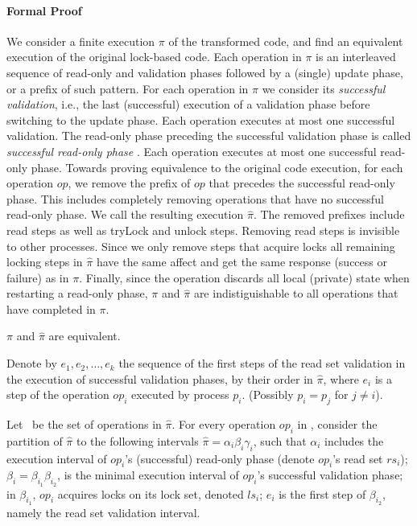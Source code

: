 \paragraph{Formal Proof}
We consider a finite execution $\pi$ of the transformed
code, and find an equivalent execution of the original lock-based
code.
Each operation in $\pi$ is an interleaved sequence of read-only and validation phases followed by a (single) update phase, or a prefix of such pattern.
For each operation in $\pi$ we consider its \emph{successful validation}, i.e.,
the last (successful) execution of a validation phase before switching to the update phase. Each operation executes at most one successful 
validation. The read-only phase preceding the successful
validation phase is called \emph{successful read-only
phase} .
Each operation executes at most one successful read-only
phase.
Towards proving equivalence to the original code execution, for each operation $op$, we remove the prefix of $op$ that precedes the successful read-only phase.
This includes completely removing operations that have no successful read-only phase.
We call the resulting execution $\hat{\pi}$.
The removed prefixes include read steps as well as tryLock and
unlock steps.
Removing read steps is invisible to other processes. Since we only remove steps that acquire locks all remaining locking steps in $\hat{\pi}$ have the same affect and get the same response (success or failure) as in $\pi$. Finally, since the operation discards all local (private) state when restarting a read-only phase, $\pi$ and $\hat{\pi}$ are indistiguishable to all operations that have completed in $\pi$.
\begin{claim}
\label{claim:pipihat}
$\pi$ and $\hat{\pi}$ are equivalent.
\end{claim}

Denote by $e_1, e_2, \ldots, e_k$ the sequence of the first steps of
the read set validation in the execution of successful validation
phases, by their order in $\hat{\pi}$, where $e_i$ is a step of the operation $op_{i}$ executed by process $p_{i}$.
(Possibly $p_i=p_j$ for $j \neq i$).

Let \op\ be the set of operations in $\hat{\pi}$.
For every operation $op_{i}$ in \op, consider the partition of $\hat{\pi}$ to
the following intervals $\hat{\pi}=\alpha_i\beta_i\gamma_i$, such that
$\alpha_i$ includes the execution interval of $op_{i}$'s (successful) read-only phase
(denote $op_{i}$'s read set $rs_{i}$); $\beta_i=\beta_{i_1}\beta_{i_2}$, is the
minimal execution interval of $op_{i}$'s successful validation phase;
in $\beta_{i_1}$, $op_{i}$ acquires 
locks on its lock set, denoted $ls_{i}$; 
$e_i$ is the first step of $\beta_{i_2}$, namely the read set validation
interval.

